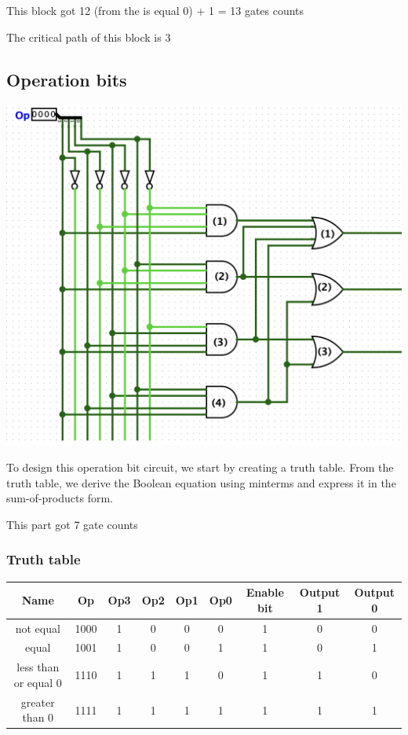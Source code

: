 \documentclass{article}
\begin{document}
\hspace{2em}This block got 12 (from the is equal 0) + 1 = 13 gates counts

\hspace{2em}The critical path of this block is 3
\subsection{Operation bits}
\begin{center}
    \includegraphics[width=1\textwidth]{images/ComparatorSelectionBits.png}
\end{center}
\hspace{2em} To design this operation bit circuit, we start by creating a truth table. From the truth table, we derive the Boolean equation using minterms and express it in the sum-of-products form.

\hspace{2em} This part got 7 gate counts
\subsubsection{Truth table}
\begin{table}[H]
\centering
\begin{tabular}{|c|c|c|c|c|c|c|c|c|}
\hline
Name & Op & Op3 & Op2 & Op1 & Op0 & Enable bit & Output 1 & Output 0 \\ \hline
not equal & 1000 & 1 & 0 & 0 & 0 & 1 & 0 & 0 \\ \hline
equal & 1001 & 1 & 0 & 0 & 1 & 1 & 0 & 1 \\ \hline
less than or equal 0 & 1110 & 1 & 1 & 1 & 0 & 1 & 1 & 0 \\ \hline
greater than 0 & 1111 & 1 & 1 & 1 & 1 & 1 & 1 & 1 \\ \hline
\end{tabular}
\end{table}
\end{document}
